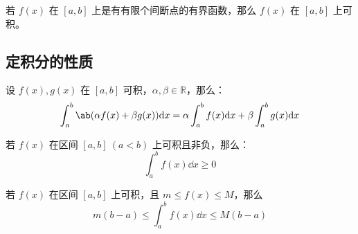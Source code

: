\begin{corollary}
	若 $f(x)$ 在 $[a, b]$ 上是有有限个间断点的有界函数，那么 $f(x)$ 在 $[a, b]$ 上可积。
\end{corollary}

\subsection{定积分的性质}

\begin{property}[定积分的线性性]
	设 $f(x), g(x)$ 在 $[a, b]$ 可积，$\alpha, \beta \in \mathbb{R}$，那么：
	$$
	\int_a^b \ab(\alpha f(x) + \beta g(x)) \dd x = \alpha \int_a^b f(x) \dd x + \beta \int_a^b g(x) \dd x
	$$
\end{property}

\begin{property}[定积分的保号性]
	若 $f(x)$ 在区间 $[a, b]\ (a < b)$ 上可积且非负，那么：
	$$
	\int_a^b f(x) \dd x \ge 0
	$$
\end{property}

\begin{property}[估值不等式]
	若 $f(x)$ 在区间 $[a, b]$ 上可积，且 $m \le f(x) \le M$，那么
	$$
	m(b - a) \le \int_a^b f(x) \dd x \le M(b - a)
	$$
\end{property}

